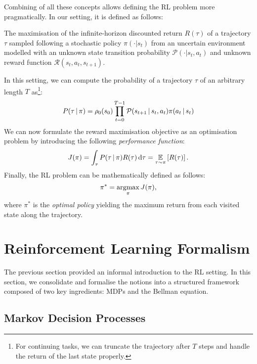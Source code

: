 Combining of all these concepts allows defining the \ac{RL} problem more pragmatically.
In our setting, it is defined as follows:
%
\begin{displayquote}
    The maximisation of the infinite-horizon discounted return $R(\tau)$ of a trajectory $\tau$ sampled following a stochastic policy $\pi(\cdot|s_t)$ from an uncertain environment modelled with an unknown state transition probability $\mathcal{P}(\cdot|s_t, a_t)$ and unknown reward function $\mathcal{R}(s_t, a_t, s_{t+1})$.
\end{displayquote}
%
In this setting, we can compute the probability of a trajectory $\tau$ of an arbitrary length $T$ as\footnote{For continuing tasks, we can truncate the trajectory after $T$ steps and handle the return of the last state properly.}:
%
\begin{equation}
    \label{equation:probability_of_trajectory}
    P(\tau \operatorname{\mid} \pi) = \rho_0(s_0) \prod_{t=0}^{T-1} \mathcal{P}(s_{t+1} \operatorname{\mid} s_t, a_t) \pi(a_t \operatorname{\mid} s_t)
\end{equation}
%
We can now formulate the reward maximisation objective as an optimisation problem by introducing the following \emph{performance function}:
%
\begin{equation}
    \label{equation:policy_performance_function}
    J(\pi)
    = \int_\tau P(\tau \operatorname{\mid} \pi) R(\tau) \dd{\tau}
    = \operatorname*{\mathbb{E}}_{\tau \sim \pi} \left[ R(\tau) \right] .
\end{equation}
%
Finally, the \ac{RL} problem can be mathematically defined as follows:
%
\begin{equation*}
    \pi^* = \operatorname*{argmax}_{\pi} J(\pi) ,
\end{equation*}
%
where $\pi^*$ is the \emph{optimal policy} yielding the maximum return from each visited state along the trajectory.

\section{Reinforcement Learning Formalism}

The previous section provided an informal introduction to the \acl{RL} setting.
In this section, we consolidate and formalise the notions into a structured framework composed of two key ingredients: \aclp{MDP} and the Bellman equation.

\subsection{Markov Decision Processes}

